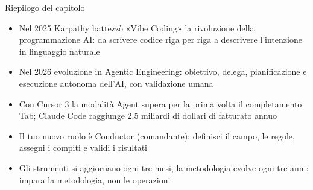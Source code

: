 \begin{tcbsummary}{Riepilogo del capitolo}
\begin{itemize}
  \item Nel 2025 Karpathy battezzò «Vibe Coding» la rivoluzione della programmazione AI: da scrivere codice riga per riga a descrivere l'intenzione in linguaggio naturale
  \item Nel 2026 evoluzione in Agentic Engineering: obiettivo, delega, pianificazione e esecuzione autonoma dell'AI, con validazione umana
  \item Con Cursor 3 la modalità Agent supera per la prima volta il completamento Tab; Claude Code raggiunge 2,5 miliardi di dollari di fatturato annuo
  \item Il tuo nuovo ruolo è Conductor (comandante): definisci il campo, le regole, assegni i compiti e validi i risultati
  \item Gli strumenti si aggiornano ogni tre mesi, la metodologia evolve ogni tre anni: impara la metodologia, non le operazioni
\end{itemize}

\end{tcbsummary}
